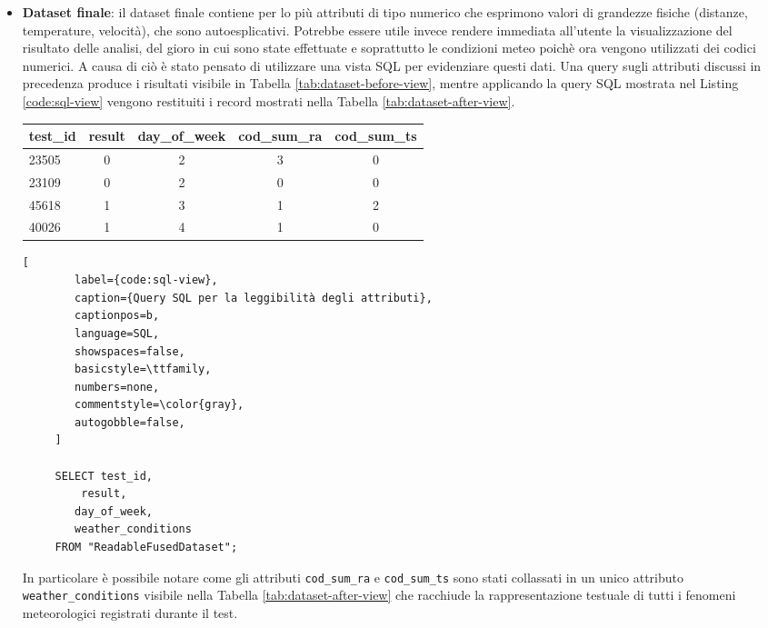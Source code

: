 \begin{itemize}
\begin{itemize}
	\end{itemize}
	
	\item \textbf{Dataset finale}: il dataset finale contiene per lo più 
	attributi di tipo numerico che esprimono valori di grandezze fisiche 
	(distanze, temperature, velocità), che sono autoesplicativi. Potrebbe 
	essere utile invece rendere immediata all'utente la visualizzazione del 
	risultato delle analisi, del gioro in cui sono state effettuate e 
	soprattutto le condizioni meteo poichè ora vengono utilizzati dei codici 
	numerici. A causa di ciò è stato pensato di utilizzare una vista SQL per 
	evidenziare questi dati. Una query sugli attributi discussi in precedenza 
	produce i risultati visibile in Tabella \ref{tab:dataset-before-view}, 
	mentre applicando la query SQL mostrata nel Listing \ref{code:sql-view} 
	vengono restituiti i record mostrati nella 
	Tabella \ref{tab:dataset-after-view}.

	\vspace{.5em}
	\begin{centering}
		\begin{tabular}{lcccc}
			\toprule
			test\_id & result & day\_of\_week & cod\_sum\_ra & cod\_sum\_ts \\
			\midrule
			23505 & 0 & 2 & 3 & 0 \\
			23109 &	0 & 2 & 0 & 0 \\
			45618 &	1 & 3 & 1 & 2 \\
			40026 &	1 & 4 & 1 & 0 \\
			\bottomrule
		\end{tabular}
		\label{tab:dataset-before-view}
	\end{centering}

	\begin{lstlisting}[
		label={code:sql-view},
		caption={Query SQL per la leggibilità degli attributi},
		captionpos=b,
		language=SQL,
		showspaces=false,
		basicstyle=\ttfamily,
		numbers=none,
		commentstyle=\color{gray},
		autogobble=false,
	 ]

	 SELECT test_id, 
		 result, 
		day_of_week, 
		weather_conditions
	 FROM "ReadableFusedDataset";

	\end{lstlisting}

	In particolare è possibile notare come gli attributi \texttt{cod\_sum\_ra} e 
	\texttt{cod\_sum\_ts} sono stati collassati in un unico attributo 
	\texttt{weather\_conditions} visibile nella Tabella 
	\ref{tab:dataset-after-view} che racchiude la rappresentazione testuale di 
	tutti i fenomeni meteorologici registrati durante il test.


\end{itemize}
